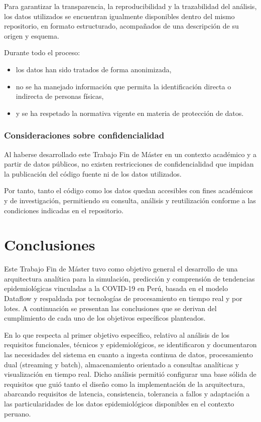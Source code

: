 \documentclass[12pt,a4paper]{article}
\providecommand{\tightlist}{%
  \setlength{\itemsep}{0pt}\setlength{\parskip}{0pt}}
\begin{document}
Para garantizar la transparencia, la reproducibilidad y la trazabilidad del análisis, los datos utilizados se encuentran igualmente disponibles dentro del mismo repositorio, en formato estructurado, acompañados de una descripción de su origen y esquema.

Durante todo el proceso:

\begin{itemize}
    \tightlist
    \item
          los datos han sido tratados de forma anonimizada,
    \item
          no se ha manejado información que permita la identificación directa o indirecta de personas físicas,
    \item
          y se ha respetado la normativa vigente en materia de protección de datos.
\end{itemize}

\subsubsection{Consideraciones sobre confidencialidad}\label{consideraciones-sobre-confidencialidad}

Al haberse desarrollado este Trabajo Fin de Máster en un contexto académico y a partir de datos públicos, no existen restricciones de confidencialidad que impidan la publicación del código fuente ni de los datos utilizados.

Por tanto, tanto el código como los datos quedan accesibles con fines académicos y de investigación, permitiendo su consulta, análisis y reutilización conforme a las condiciones indicadas en el repositorio.

\clearpage
\section{Conclusiones}\label{conclusiones}

Este Trabajo Fin de Máster tuvo como objetivo general el desarrollo de una arquitectura analítica para la simulación, predicción y comprensión de tendencias epidemiológicas vinculadas a la COVID-19 en Perú, basada en el modelo Dataflow y respaldada por tecnologías de procesamiento en tiempo real y por lotes. A continuación se presentan las conclusiones que se derivan del cumplimiento de cada uno de los objetivos específicos planteados.

En lo que respecta al primer objetivo específico, relativo al análisis de los requisitos funcionales, técnicos y epidemiológicos, se identificaron y documentaron las necesidades del sistema en cuanto a ingesta continua de datos, procesamiento dual (streaming y batch), almacenamiento orientado a consultas analíticas y visualización en tiempo real. Dicho análisis permitió configurar una base sólida de requisitos que guió tanto el diseño como la implementación de la arquitectura, abarcando requisitos de latencia, consistencia, tolerancia a fallos y adaptación a las particularidades de los datos epidemiológicos disponibles en el contexto peruano.
\end{document}
